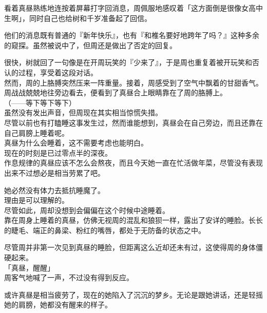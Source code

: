 看着真昼熟练地连按着屏幕打字回消息，周佩服地感叹着「这方面倒是很像女高中生啊」，同时自己也给树和千岁准备起了回信。

他们的消息既有普通的『新年快乐』，也有『和椎名要好地跨年了吗？』这种多余的窥探。虽然被说中了，但周还是做出了否定的回复。

很快，树就回了一句像是在开周玩笑的『少来了』，于是周也重复着被开玩笑和否认的过程，享受着这段对话。\\

然而，周的上胳膊突然压来一阵重量。接着，周感受到了空气中飘着的甘甜香气。\\

周战战兢兢地往旁边看去，便看到了真昼合上眼睛靠在了周的胳膊上。\\

（——等下等下等下）\\

虽然没有发出声音，但周现在其实相当惊慌失措。\\

尽管以前也有打瞌睡这事发生过，然而谁能想到，真昼会在自己旁边，而且还靠在自己肩膀上睡着呢。\\

真昼为什么会睡着，这不需要考虑也能明白。\\

现在的时刻是已过零点半的深夜。\\

作息规律的真昼应该不怎么会熬夜，而且今天她一直在忙活做年菜，尽管没有表现出来不过想必是相当劳累了吧。

她必然没有体力去抵抗睡魔了。\\

理由是可以理解的。\\

尽管如此，周却没想到会偏偏在这个时候中途睡着。\\

靠在周身上睡着的真昼，仿佛无视周的混乱和狼狈一样，露出了安详的睡脸。长长的睫毛、端正的鼻梁、粉红的嘴唇，都处于无防备的状态之中。

尽管周并非第一次见到真昼的睡脸，但距离这么近却还未有过，这使得周的身体僵硬起来。\\

「真昼，醒醒」\\

周客气地喊了一声，不过没有得到反应。

或许真昼是相当疲劳了，现在的她陷入了沉沉的梦乡。无论是跟她讲话，还是轻摇她的肩膀，她都没有醒来的样子。\\

